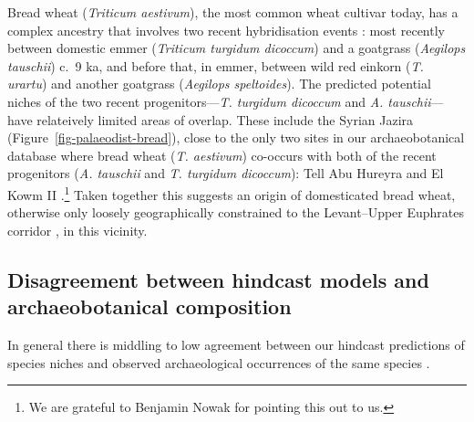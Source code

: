\documentclass[
  authoryear,
  preprint]{elsarticle}
\begin{document}
Bread wheat (\emph{Triticum aestivum}), the most common wheat cultivar
today, has a complex ancestry that involves two recent hybridisation
events \citep{LevyFeldman2022}: most recently between domestic emmer
(\emph{Triticum turgidum dicoccum}) and a goatgrass (\emph{Aegilops
tauschii}) c.~9 ka, and before that, in emmer, between wild red einkorn
(\emph{T. urartu}) and another goatgrass (\emph{Aegilops speltoides}).
The predicted potential niches of the two recent progenitors---\emph{T.
turgidum dicoccum} and \emph{A. tauschii}---have relateively limited
areas of overlap. These include the Syrian Jazira
(Figure~\ref{fig-palaeodist-bread}), close to the only two sites in our
archaeobotanical database where bread wheat (\emph{T. aestivum})
co-occurs with both of the recent progenitors (\emph{A. tauschii} and
\emph{T. turgidum dicoccum}): Tell Abu Hureyra and El Kowm II
\citep{ArranzOtaeguiRoe2023}.\footnote{We are grateful to Benjamin Nowak
  for pointing this out to us.} Taken together this suggests an origin
of domesticated bread wheat, otherwise only loosely geographically
constrained to the Levant--Upper Euphrates corridor
\citep{LevyFeldman2022}, in this vicinity.

\subsection{Disagreement between hindcast models and archaeobotanical
composition}\label{sec-discuss-hindcasting}

In general there is middling to low agreement between our hindcast
predictions of species niches and observed archaeological occurrences of
the same species \citep{tlb-results-summary}.
\end{document}
